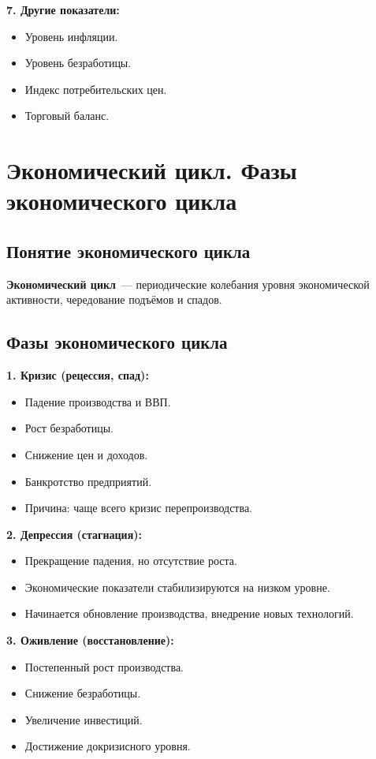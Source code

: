 \documentclass[12pt]{article}
\begin{document}
	\noindent \textbf{7. Другие показатели:}
	\begin{itemize}
		\item Уровень инфляции.
		\item Уровень безработицы.
		\item Индекс потребительских цен.
		\item Торговый баланс.
	\end{itemize}
	
	\section{Экономический цикл. Фазы экономического цикла}
	
	\subsection{Понятие экономического цикла}
	
	\textbf{Экономический цикл}~--- периодические колебания уровня экономической активности, чередование подъёмов и спадов.
	
	\subsection{Фазы экономического цикла}
	
	\textbf{1. Кризис (рецессия, спад):}
	\begin{itemize}
		\item Падение производства и ВВП.
		\item Рост безработицы.
		\item Снижение цен и доходов.
		\item Банкротство предприятий.
		\item Причина: чаще всего кризис перепроизводства.
	\end{itemize}
	
	\noindent \textbf{2. Депрессия (стагнация):}
	\begin{itemize}
		\item Прекращение падения, но отсутствие роста.
		\item Экономические показатели стабилизируются на низком уровне.
		\item Начинается обновление производства, внедрение новых технологий.
	\end{itemize}
	
	\noindent \textbf{3. Оживление (восстановление):}
	\begin{itemize}
		\item Постепенный рост производства.
		\item Снижение безработицы.
		\item Увеличение инвестиций.
		\item Достижение докризисного уровня.
	\end{itemize}
	
\end{document}
